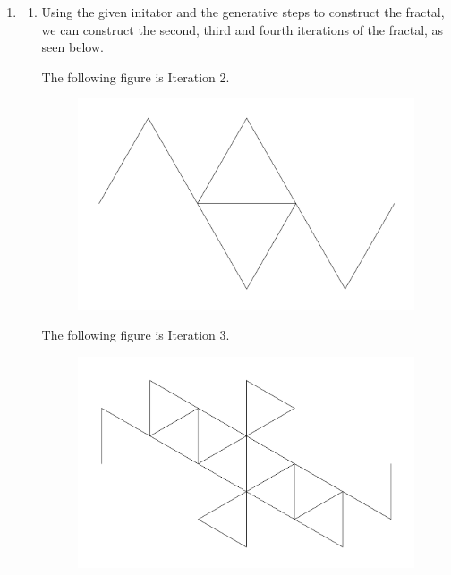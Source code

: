\documentclass[a4paper]{article}
\begin{document}
\begin{enumerate}[label=\textbf{\arabic*.}]
	\item

	\begin{enumerate}
		\item Using the given initator and the generative steps to construct the fractal, we can construct the second, third and fourth iterations of the fractal, as seen below.


		The following figure is Iteration 2.

		\begin{center}
		\begin{figure}[h!]
			\includegraphics[width=\linewidth]{IFS2_S.png}
		\end{figure}
		\end{center}

		\bigbreak

		The following figure is Iteration 3.

		\begin{center}
		\begin{figure}[h!]
			\includegraphics[width=\linewidth]{IFS3_S.png}
		\end{figure}
		\end{center}


\end{enumerate}
\end{enumerate}
\end{document}
